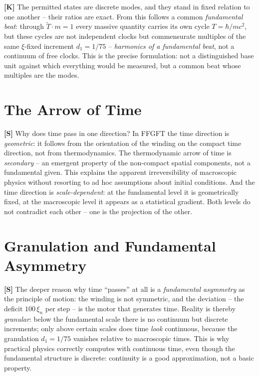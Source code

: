 \textbf{[K]} The permitted states are discrete modes, and they stand in fixed
relation to one another -- their ratios are exact. From this follows a common
\emph{fundamental beat}: through $\tilde T\cdot m=1$ every massive quantity
carries its own cycle $T=\hbar/mc^2$, but these cycles are not independent
clocks but commensurate multiples of the same $\xi$-fixed increment $d_1=1/75$
-- \emph{harmonics of a fundamental beat}, not a continuum of free clocks. This
is the precise formulation: not a distinguished base unit against which everything
would be measured, but a common beat whose multiples are the modes.

\section{The Arrow of Time}

\textbf{[S]} Why does time pass in one direction? In FFGFT the time direction is
\emph{geometric}: it follows from the orientation of the winding on the compact
time direction, not from thermodynamics. The thermodynamic arrow of time is
\emph{secondary} -- an emergent property of the non-compact spatial components,
not a fundamental given. This explains the apparent irreversibility of macroscopic
physics without resorting to ad hoc assumptions about initial conditions. And the
time direction is \emph{scale-dependent}: at the fundamental level it is
geometrically fixed, at the macroscopic level it appears as a statistical gradient.
Both levels do not contradict each other -- one is the projection of the other.

\section{Granulation and Fundamental Asymmetry}

\textbf{[S]} The deeper reason why time ``passes'' at all is a \emph{fundamental
asymmetry} as the principle of motion: the winding is not symmetric, and the
deviation -- the deficit $100\,\xi_n$ per step -- is the motor that generates
time. Reality is thereby \emph{granular}: below the fundamental scale there is no
continuum but discrete increments; only above certain scales does time \emph{look}
continuous, because the granulation $d_1=1/75$ vanishes relative to macroscopic
times. This is why practical physics correctly computes with continuous time,
even though the fundamental structure is discrete: continuity is a good
approximation, not a basic property.

